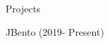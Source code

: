 \documentclass[]{johnsoncv}
\begin{document}
\begin{cvsection}{Projects}
\begin{cvsubsection}{JBento (2019- Present)}{}{}
\begin{itemize}
			\end{itemize}
	\end{cvsubsection}

	\end{cvsection}
\end{document}
